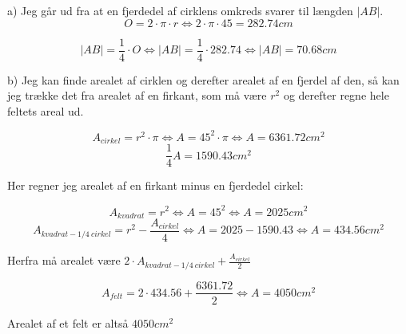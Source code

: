 a) 
Jeg går ud fra at en fjerdedel af cirklens omkreds svarer til længden $|AB|$.
$$O=2\cdot \pi \cdot r \Longleftrightarrow 2 \cdot \pi \cdot 45 = 282.74cm$$

$$|AB| =\frac{1}{4}\cdot O \Longleftrightarrow |AB|=\frac{1}{4}\cdot 282.74 \Longleftrightarrow |AB|=70.68cm$$\newline

b)
Jeg kan finde arealet af cirklen og derefter arealet af en fjerdel af den, så kan jeg trække det fra arealet af en firkant, som må være $r^2$ og derefter regne hele feltets areal ud.

$$A_{cirkel}=r^2\cdot \pi \Longleftrightarrow A=45^2 \cdot \pi \Longleftrightarrow A = 6361.72cm^2$$
$$\frac{1}{4}A=1590.43cm^2$$

Her regner jeg arealet af en firkant minus en fjerdedel cirkel:

$$A_{kvadrat}=r^2\Longleftrightarrow A=45^2 \Longleftrightarrow A = 2025cm^2$$
$$A_{kvadrat - 1/4\:cirkel}=r^2 - \frac{A_{cirkel}}{4}\Longleftrightarrow A = 2025 - 1590.43 \Longleftrightarrow A=434.56cm^2$$

Herfra må arealet være $2\cdot A_{kvadrat - 1/4\:cirkel} + \frac{A_{cirkel}}{2}$

$$A_{felt} = 2\cdot 434.56 + \frac{6361.72}{2} \Longleftrightarrow A=4050cm^2 $$

Arealet af et felt er altså $4050cm^2$\newline

